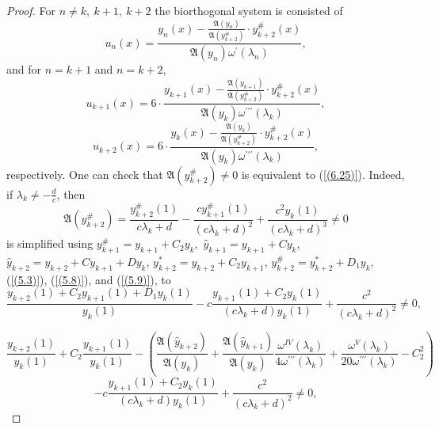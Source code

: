 \documentclass[pdflatex,sn-mathphys-num]{sn-jnl}%
\theoremstyle{thmstyleone}%
\theoremstyle{thmstyletwo}%
\theoremstyle{thmstylethree}%
\theoremstyle{definition}
\theoremstyle{remark}
\numberwithin{equation}{section}
\begin{document}
\begin{proof} For $n \ne k,\ k+1,\ k+2$ the biorthogonal system is consisted of
\begin{equation}
u_n(x)=\frac{y_n(x)-\frac{\mathfrak{A}(y_{n})}{\mathfrak{A}(y_{k+2}^{\#})}\cdot y^{\#}_{k+2}(x)}{ \mathfrak{A}(y_{n})\omega^\prime(\lambda_n)}
, \label{(6.26)}
\end{equation}
and for $n = k+1$ and $n = k+2$,
\begin{equation}
u_{k+1}(x)=6\cdot\frac{y_{k+1}(x)-\frac{\mathfrak{A}(y_{k+1})}{\mathfrak{A}(y^{\#}_{k+2})}\cdot y^{\#}_{k+2}(x)}{ \mathfrak{A}(y_{k})\omega^{\prime\prime\prime}(\lambda_k)}
, \label{(6.27)}
\end{equation}
\begin{equation}
u_{k+2}(x)=6\cdot\frac{y_{k}(x)-\frac{\mathfrak{A}(y_{k})}{\mathfrak{A}(y^{\#}_{k+2})}\cdot y^{\#}_{k+2}(x)}{ \mathfrak{A}(y_{k})\omega^{\prime\prime\prime}(\lambda_k)}
, \label{(6.28)}
\end{equation}
respectively. One can check that $\mathfrak{A}(y_{k+2}^{\#})\neq 0$ is equivalent to (\ref{(6.25)}).
Indeed, if $\lambda_k\neq-\frac{d}{c}$, then
\begin{equation}
 \mathfrak{A}(y^{\#}_{k+2}) =
\frac{y^{\#}_{k + 2}(1)}{c\lambda_{k} + d} - \frac{cy^{\#}_{k+1}(1)}{\left( c\lambda_{k} + d \right)^{2}}
+\frac{c^2y_{k}(1)}{\left( c\lambda_{k} + d \right)^{3}}\neq0
 \label{(6.28.1.1)}
\end{equation}
is simplified using 
\(
y_{k+1}^\# = y_{k+1} + C_2 y_k,
\)
$\hat{y}_{k+1}={y}_{k+1}+Cy_k$,
$\hat{y}_{k+2}={y}_{k+2}+Cy_{k+1}+Dy_k$,
\(y^{*}_{k+2}=y_{k+2}+C_{2}y_{k+1}\),
$y^{\#}_{k+2}=y^{*}_{k+2}+D_{1}y_{k}$,
(\ref{(5.3)}), (\ref{(5.8)}), and (\ref{(5.9)}), to
$$
\frac{y_{k+2}(1) + C_2 y_{k+1}(1) + D_1 y_k(1)}{y_k(1)} - c\frac{y_{k+1}(1) + C_2 y_k(1)}{(c\lambda_k+d)y_k(1)} + \frac{c^2}{(c\lambda_k+d)^2} \neq 0,
$$

$$
\frac{y_{k+2}(1)}{y_k(1)} + C_2\frac{y_{k+1}(1)}{y_k(1)} - \left( \frac{\mathfrak{A}(\hat{y}_{k+2})}{\mathfrak{A}(y_k)} + \frac{\mathfrak{A}(\hat{y}_{k+1})}{\mathfrak{A}(y_k)}\frac{\omega^{IV}(\lambda_k)}{4\omega^{\prime\prime\prime}(\lambda_k)} + \frac{\omega^{V}(\lambda_k)}{20\omega^{\prime\prime\prime}(\lambda_k)} - C_2^2 \right)$$
$$- c\frac{y_{k+1}(1) + C_2 y_k(1)}{(c\lambda_k+d)y_k(1)} + \frac{c^2}{(c\lambda_k+d)^2} \neq 0,
$$


\end{proof}
\end{document}
